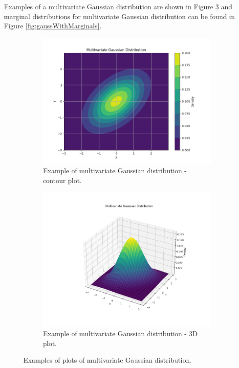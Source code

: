 Examples of a multivariate Gaussian distribution are shown in Figure \ref{fig:mvnplot} and marginal distributions for
multivariate Gaussian distribution can be found in Figure \ref{fig:gaussWithMarginals}.
\begin{figure}[htbp]
    \centering
    \begin{subfigure}[b]{0.45\textwidth}
        \centering
        \includegraphics[width=\textwidth]{text/chapter_01/imgs/mvn_contour}
        \caption{Example of multivariate Gaussian distribution - contour plot.}
        \label{fig:mvn_contour}
    \end{subfigure}
    \hfill
    \begin{subfigure}[b]{0.45\textwidth}
        \centering
        \includegraphics[width=\textwidth]{text/chapter_01/imgs/mvn_3d}
        \caption{Example of multivariate Gaussian distribution - 3D plot.}
        \label{fig:mvn_3d}
    \end{subfigure}
    \caption{Examples of plots of multivariate Gaussian distribution.}
    \label{fig:mvnplot}
\end{figure}

